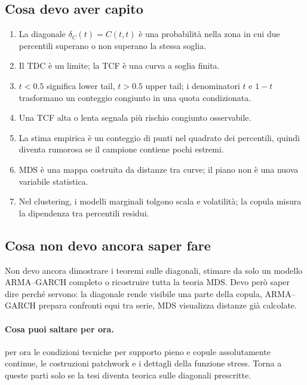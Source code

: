 \documentclass[11pt,a4paper]{article}
\newcommand{\Salta}{\paragraph{Cosa puoi saltare per ora.}}
\begin{document}
\subsection*{Cosa devo aver capito}
\begin{enumerate}[leftmargin=*]
  \item La diagonale $\delta_C(t)=C(t,t)$ è una probabilità nella zona in cui
  due percentili superano o non superano la stessa soglia.
  \item Il TDC è un limite; la TCF è una curva a soglia finita.
  \item $t<0.5$ significa lower tail, $t>0.5$ upper tail; i denominatori $t$
  e $1-t$ trasformano un conteggio congiunto in una quota condizionata.
  \item Una TCF alta o lenta segnala più rischio congiunto osservabile.
  \item La stima empirica è un conteggio di punti nel quadrato dei percentili,
  quindi diventa rumorosa se il campione contiene pochi estremi.
  \item MDS è una mappa costruita da distanze tra curve; il piano non è una
  nuova variabile statistica.
  \item Nel clustering, i modelli marginali tolgono scala e volatilità; la
  copula misura la dipendenza tra percentili residui.
\end{enumerate}

\subsection*{Cosa non devo ancora saper fare}
Non devo ancora dimostrare i teoremi sulle diagonali, stimare da solo un modello
ARMA--GARCH completo o ricostruire tutta la teoria MDS. Devo però saper dire
perché servono: la diagonale rende visibile una parte della copula, ARMA--GARCH
prepara confronti equi tra serie, MDS visualizza distanze già calcolate.

\Salta per ora le condizioni tecniche per supporto pieno e copule assolutamente
continue, le costruzioni patchwork e i dettagli della funzione stress. Torna a
queste parti solo se la tesi diventa teorica sulle diagonali prescritte.
\end{document}
